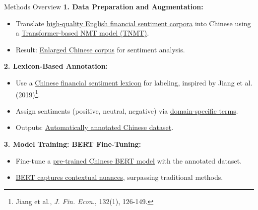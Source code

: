 \documentclass[aspectratio=169]{beamer}
\begin{document}
\begin{frame}{Methods Overview}
  \textbf{1. Data Preparation and Augmentation:}
  \begin{itemize}
    \item Translate \underline{high-quality English financial sentiment corpora} into Chinese using a \underline{Transformer-based NMT model (TNMT)}.
    \item Result: \underline{Enlarged Chinese corpus} for sentiment analysis.
  \end{itemize}
  
  \textbf{2. Lexicon-Based Annotation:}
  \begin{itemize}
    \item Use a \underline{Chinese financial sentiment lexicon} for labeling, inspired by Jiang et al. (2019)\footnote{Jiang et al., \textit{J. Fin. Econ.}, 132(1), 126-149.}.
    \item Assign sentiments (positive, neutral, negative) via \underline{domain-specific terms}.
    \item Outputs: \underline{Automatically annotated Chinese dataset}.
  \end{itemize}
  
  \textbf{3. Model Training: BERT Fine-Tuning:}
  \begin{itemize}
    \item Fine-tune a \underline{pre-trained Chinese BERT model} with the annotated dataset.
    \item \underline{BERT captures contextual nuances}, surpassing traditional methods.
  \end{itemize}
  \end{frame}  
\end{document}
